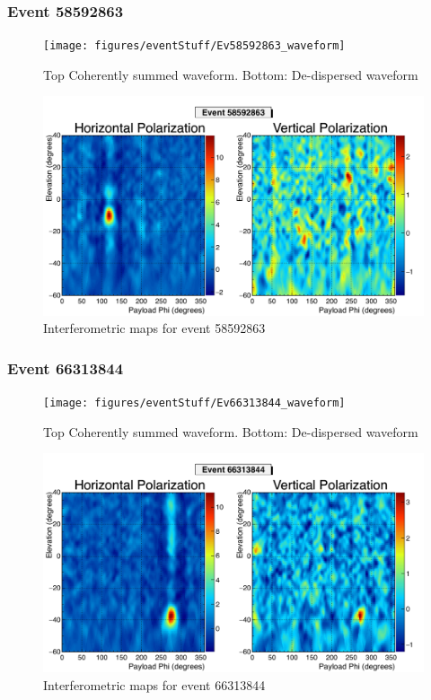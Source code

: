 		\subsubsection{Event 58592863}
		\begin{figure}
		\centering
			\texttt{[image: figures/eventStuff/Ev58592863\_waveform]}
			\caption{Top Coherently summed waveform.  Bottom: De-dispersed waveform} 
		\label{fig:Ev58592863_waveform}
		\end{figure}
		
		\begin{figure}
		\centering
			\includegraphics[width=\textwidth]{figures/intMap/intMap_ev58592863}
			\caption{Interferometric maps for event 58592863} 
		\label{fig:Ev58592863_map}
		\end{figure}			
	
		\subsubsection{Event 66313844}
		\begin{figure}
		\centering
			\texttt{[image: figures/eventStuff/Ev66313844\_waveform]}
			\caption{Top Coherently summed waveform.  Bottom: De-dispersed waveform} 
		\label{fig:Ev66313844_waveform}
		\end{figure}
		
		\begin{figure}
		\centering
			\includegraphics[width=\textwidth]{figures/intMap/intMap_ev66313844}
			\caption{Interferometric maps for event 66313844} 
		\label{fig:Ev66313844_map}
		\end{figure}			
	
